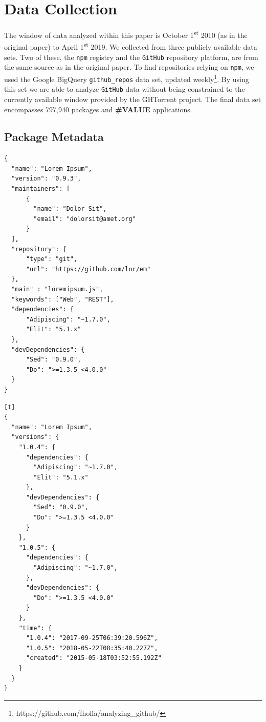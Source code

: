 \documentclass[10pt,conference]{IEEEtran}
\def\code#1{\texttt{#1}}
\begin{document}
\section{Data Collection}
The window of data analyzed within this paper is October 1\textsuperscript{st} 2010 (as in the original paper) to April 1\textsuperscript{st} 2019.
We collected from three publicly available data sets. Two of these, the \code{npm} registry and the \code{GitHub} repository platform, are from the same source as in the original paper.
To find repositories relying on \code{npm}, we used the Google BigQuery \code{github\_repos} data set, updated weekly\footnote{https://github.com/fhoffa/analyzing\_github/}.
By using this set we are able to analyze \code{GitHub} data without being constrained to the currently available window provided by the GHTorrent project\cite{Gousi13}.
The final data set encompasses 797,940 packages and \textbf{\#VALUE} applications.

\subsection{Package Metadata} \label{Package Metadata}

\begin{lstlisting}[caption={A mock \code{npm} package.json. Some fields omitted for brevity.},captionpos=b,
  label=samplePkg, frame=single, firstline=1]
{
  "name": "Lorem Ipsum",
  "version": "0.9.3",
  "maintainers": [
      {
        "name": "Dolor Sit",
        "email": "dolorsit@amet.org"
      }
  ],
  "repository": {
      "type": "git",
      "url": "https://github.com/lor/em"
  },
  "main" : "loremipsum.js",
  "keywords": ["Web", "REST"],
  "dependencies": {
      "Adipiscing": "~1.7.0",
      "Elit": "5.1.x"
  },
  "devDependencies": {
      "Sed": "0.9.0",
      "Do": ">=1.3.5 <4.0.0" 
  }
}
\end{lstlisting}

\begin{lstlisting}[caption={A mock simplified \code{npm} metadata file.},captionpos=b,
  label=sampleSimpleMetadata, frame=single, firstline=1][t]
{
  "name": "Lorem Ipsum",
  "versions": {
    "1.0.4": {
      "dependencies": {
        "Adipiscing": "~1.7.0",
        "Elit": "5.1.x"
      },
      "devDependencies": {
        "Sed": "0.9.0",
        "Do": ">=1.3.5 <4.0.0"
      }
    },
    "1.0.5": {
      "dependencies": {
        "Adipiscing": "~1.7.0",
      },
      "devDependencies": {
        "Do": ">=1.3.5 <4.0.0"
      }
    },
    "time": {
      "1.0.4": "2017-09-25T06:39:20.596Z",
      "1.0.5": "2018-05-22T08:35:40.227Z",
      "created": "2015-05-18T03:52:55.192Z"
    }
  }
}
\end{lstlisting}
\end{document}
